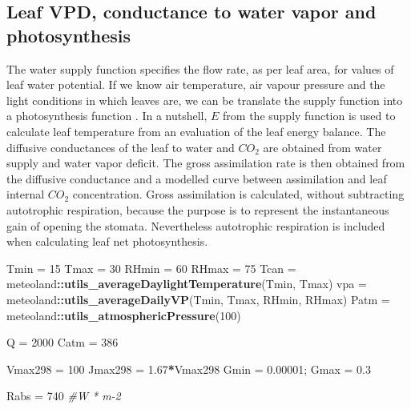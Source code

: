 \documentclass[]{book}
\newenvironment{Shaded}{\begin{snugshade}}{\end{snugshade}}
\newcommand{\KeywordTok}[1]{\textcolor[rgb]{0.13,0.29,0.53}{\textbf{#1}}}
\newcommand{\DecValTok}[1]{\textcolor[rgb]{0.00,0.00,0.81}{#1}}
\newcommand{\FloatTok}[1]{\textcolor[rgb]{0.00,0.00,0.81}{#1}}
\newcommand{\StringTok}[1]{\textcolor[rgb]{0.31,0.60,0.02}{#1}}
\newcommand{\CommentTok}[1]{\textcolor[rgb]{0.56,0.35,0.01}{\textit{#1}}}
\newcommand{\OperatorTok}[1]{\textcolor[rgb]{0.81,0.36,0.00}{\textbf{#1}}}
\newcommand{\NormalTok}[1]{#1}
\begin{document}
\hypertarget{leaf-vpd-conductance-to-water-vapor-and-photosynthesis}{%
\subsection{Leaf VPD, conductance to water vapor and photosynthesis}\label{leaf-vpd-conductance-to-water-vapor-and-photosynthesis}}

The water supply function specifies the flow rate, as per leaf area, for values of leaf water potential. If we know air temperature, air vapour pressure and the light conditions in which leaves are, we can be translate the supply function into a photosynthesis function \citep{Sperry2016}. In a nutshell, \(E\) from the supply function is used to calculate leaf temperature from an evaluation of the leaf energy balance. The diffusive conductances of the leaf to water and \(CO_{2}\) are obtained from water supply and water vapor deficit. The gross assimilation rate is then obtained from the diffusive conductance and a modelled curve between assimilation and leaf internal \(CO_{2}\) concentration. Gross assimilation is calculated, without subtracting autotrophic respiration, because the purpose is to represent the instantaneous gain of opening the stomata. Nevertheless autotrophic respiration is included when calculating leaf net photosynthesis.

\begin{Shaded}
\begin{Highlighting}[]
\NormalTok{Tmin =}\StringTok{ }\DecValTok{15}
\NormalTok{Tmax =}\StringTok{ }\DecValTok{30}
\NormalTok{RHmin =}\StringTok{ }\DecValTok{60}
\NormalTok{RHmax =}\StringTok{ }\DecValTok{75}
\NormalTok{Tcan =}\StringTok{ }\NormalTok{meteoland}\OperatorTok{::}\KeywordTok{utils_averageDaylightTemperature}\NormalTok{(Tmin, Tmax)}
\NormalTok{vpa =}\StringTok{ }\NormalTok{meteoland}\OperatorTok{::}\KeywordTok{utils_averageDailyVP}\NormalTok{(Tmin, Tmax, RHmin, RHmax)}
\NormalTok{Patm =}\StringTok{ }\NormalTok{meteoland}\OperatorTok{::}\KeywordTok{utils_atmosphericPressure}\NormalTok{(}\DecValTok{100}\NormalTok{)}

\NormalTok{Q =}\StringTok{ }\DecValTok{2000}
\NormalTok{Catm =}\StringTok{ }\DecValTok{386}

\NormalTok{Vmax298 =}\StringTok{ }\DecValTok{100}
\NormalTok{Jmax298 =}\StringTok{ }\FloatTok{1.67}\OperatorTok{*}\NormalTok{Vmax298}
\NormalTok{Gmin =}\StringTok{ }\FloatTok{0.00001}\NormalTok{;}
\NormalTok{Gmax =}\StringTok{ }\FloatTok{0.3}

\NormalTok{Rabs =}\StringTok{ }\DecValTok{740} \CommentTok{#W * m-2}
\end{Highlighting}
\end{Shaded}
\end{document}
